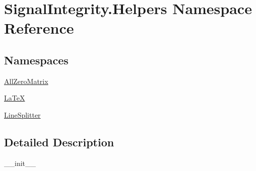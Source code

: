 \hypertarget{namespaceSignalIntegrity_1_1Helpers}{}\section{Signal\+Integrity.\+Helpers Namespace Reference}
\label{namespaceSignalIntegrity_1_1Helpers}
\subsection*{Namespaces}
\begin{DoxyCompactItemize}
\item 
 \hyperlink{namespaceSignalIntegrity_1_1Helpers_1_1AllZeroMatrix}{All\+Zero\+Matrix}
\item 
 \hyperlink{namespaceSignalIntegrity_1_1Helpers_1_1LaTeX}{La\+TeX}
\item 
 \hyperlink{namespaceSignalIntegrity_1_1Helpers_1_1LineSplitter}{Line\+Splitter}
\end{DoxyCompactItemize}


\subsection{Detailed Description}
\begin{DoxyVerb}__init__\end{DoxyVerb}
 